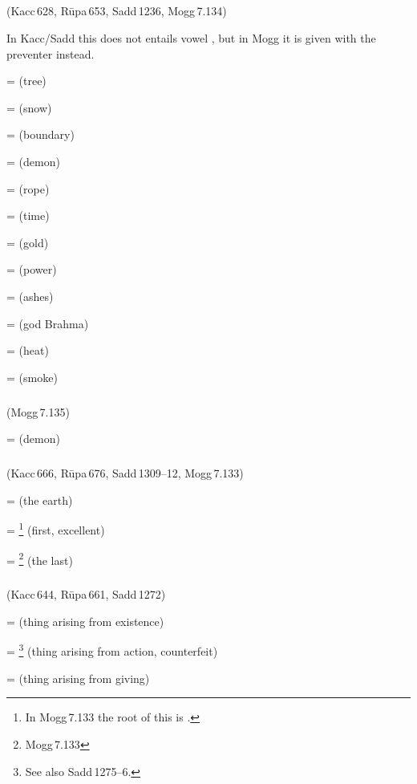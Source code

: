 \subparagraph*{} (Kacc\,628, R\=upa\,653, Sadd\,1236, Mogg\,7.134)\label{pacckx:ma2}\label{pacckx:maka}

In Kacc/Sadd this  does not entails vowel , but in Mogg it is given with the preventer  instead.

 =  (tree)\par
{} =  (snow)\par
{} =  (boundary)\par
{} =  (demon)\par
{} =  (rope)\par
{} =  (time)\par
{} =  (gold)\par
{} =  (power)\par
{} =  (ashes)\par
{} =  (god Brahma)\par
{} =  (heat)\par
{} =  (smoke)\par

\subparagraph*{} (Mogg\,7.135)\label{pacckx:riisana}

 =  (demon)\par

\subparagraph*{} (Kacc\,666, R\=upa\,676, Sadd\,1309--12, Mogg\,7.133)\label{pacckx:ama}\label{pacckx:ima}

 =  (the earth)\par
{} = \footnote{In Mogg\,7.133 the root of this is .} (first, excellent)\par
{} = \footnote{Mogg\,7.133} (the last)\par

\subparagraph*{} (Kacc\,644, R\=upa\,661, Sadd\,1272)\label{pacckx:ttima}

 =  (thing arising from existence)\par
{} = \footnote{See also Sadd\,1275--6.} (thing arising from action, counterfeit)\par
{} =  (thing arising from giving)\par

